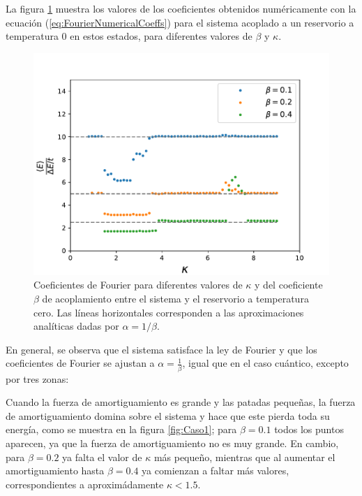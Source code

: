 \documentclass[letterpaper,12pt,oneside]{book}
\begin{document}
La figura \ref{fig:CoeffsFourierT0} muestra los valores de los coeficientes obtenidos numéricamente con la ecuación (\ref{eq:FourierNumericalCoeffs}) para el sistema acoplado a un reservorio a temperatura 0 en estos estados, para diferentes valores de $\beta$ y $\kappa$.

\begin{figure}[h!]
	\centering
	\includegraphics[width=12cm]{Figs/FourierCoeffsT0}
	\caption{Coeficientes de Fourier para diferentes valores de $\kappa$ y del coeficiente $\beta$ de acoplamiento entre el sistema y el reservorio a temperatura cero. Las líneas horizontales corresponden a las aproximaciones analíticas dadas por $\alpha=1/\beta.$}
	\label{fig:CoeffsFourierT0}
\end{figure}

En general, se observa que el sistema satisface la ley de Fourier y que los coeficientes de Fourier se ajustan a $\alpha=\frac{1}{\beta}$, igual que en el caso cuántico, excepto por tres zonas:

Cuando la fuerza de amortiguamiento es grande y las patadas pequeñas, la fuerza de amortiguamiento domina sobre el sistema y hace que este pierda toda su energía, como se muestra en la figura \ref{fig:Caso1}; para $\beta = 0.1$ todos los puntos aparecen, ya que la fuerza de amortiguamiento no es muy grande. En cambio, para $\beta = 0.2$ ya falta el valor de $\kappa$ más pequeño, mientras que al aumentar el amortiguamiento hasta $\beta = 0.4$ ya comienzan a faltar más valores, correspondientes a aproximádamente $\kappa < 1.5$.
\end{document}
